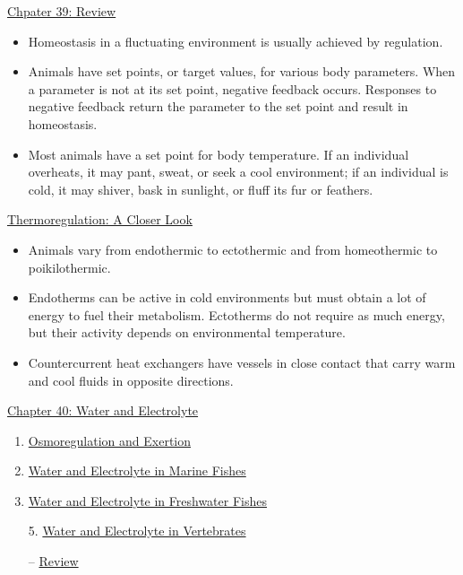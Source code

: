 \documentclass[12pt,letterpaper]{article}
\newcommand{\thetitle}{\hypertarget{home}{Animals and Ecology}}
\begin{document}
\begin{probbox}{\hyperlink{39}{Chpater 39: Review}}
{\begin{itemize}
            \item Homeostasis in a fluctuating environment is usually achieved by regulation. 
            \item Animals have set points, or target values, for various body parameters. When a parameter is not at its set point, negative feedback occurs. Responses to negative feedback return the parameter to the set point and result in homeostasis. 
            \item Most animals have a set point for body temperature. If an individual overheats, it may pant, sweat, or seek a cool environment; if an individual is cold, it may shiver, bask in sunlight, or fluff its fur or feathers.
        \end{itemize}
    \hyperlink{39.5}{Thermoregulation: A Closer Look}
    \begin{itemize}
            \item Animals vary from endothermic to ectothermic and from homeothermic to poikilothermic. 
            \item Endotherms can be active in cold environments but must obtain a lot of energy to fuel their metabolism. Ectotherms do not require as much energy, but their activity depends on environmental temperature. 
            \item Countercurrent heat exchangers have vessels in close contact that carry warm and cool fluids in opposite directions.
    \end{itemize}        
}\end{probbox}


\clearpage

\renewcommand{\thetitle}{\hypertarget{40}{Water and Electrolye Balance}}
\hypertarget{40}{}
\setcounter{section}{40}

\begin{chapbox}{\hyperlink{home}{Chapter 40: Water and Electrolyte}}
    \begin{enumerate}
        \item \hyperlink{40.1}{Osmoregulation and Exertion}
        \item \hyperlink{40.2}{Water and Electrolyte in Marine Fishes}
        \item \hyperlink{40.3}{Water and Electrolyte in Freshwater Fishes}
        \item [5.] \hyperlink{40.5}{Water and Electrolyte in Vertebrates}
        \item [--] \hyperlink{40.r}{Review}
    \end{enumerate}
\end{chapbox}
\end{document}
